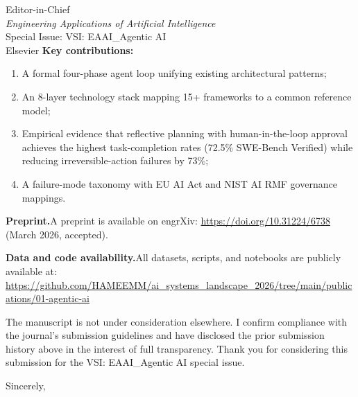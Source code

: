 \documentclass[10pt]{letter}
\begin{document}
\begin{letter}{Editor-in-Chief\\
\emph{Engineering Applications of Artificial Intelligence}\\
Special Issue: VSI: EAAI\_Agentic AI\\
Elsevier}
\textbf{Key contributions:}
\begin{enumerate}[nosep, leftmargin=1.5em]
    \item A formal four-phase agent loop unifying existing architectural patterns;
    \item An 8-layer technology stack mapping 15+ frameworks to a common reference model;
    \item Empirical evidence that reflective planning with human-in-the-loop approval achieves the highest task-completion rates (72.5\% SWE-Bench Verified) while reducing irreversible-action failures by 73\%;
    \item A failure-mode taxonomy with EU AI Act and NIST AI RMF governance mappings.
\end{enumerate}

\textbf{Preprint.}\quad A preprint is available on engrXiv: \url{https://doi.org/10.31224/6738} (March 2026, accepted).

\textbf{Data and code availability.}\quad All datasets, scripts, and notebooks are publicly available at: \url{https://github.com/HAMEEMM/ai_systems_landscape_2026/tree/main/publications/01-agentic-ai}

The manuscript is not under consideration elsewhere. I confirm compliance with the journal's submission guidelines and have disclosed the prior submission history above in the interest of full transparency. Thank you for considering this submission for the VSI: EAAI\_Agentic AI special issue.

\closing{Sincerely,}

\end{letter}
\end{document}
